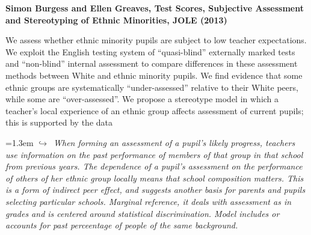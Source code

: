 \documentclass[11pt]{article}
\newcommand{\entry}[3]{%
  \par\medskip\noindent\textbf{#1}\par
  \nopagebreak #2\hspace{0.35em}{\small\color{tagcol}[#3]}\par}
\newcommand{\note}[1]{\par\smallskip\noindent\hangindent=1.3em
  \textcolor{notecol}{\footnotesize$\hookrightarrow$~\textit{#1}}}
\begin{document}
\entry{Simon Burgess and Ellen Greaves, Test Scores, Subjective Assessment and Stereotyping  of Ethnic Minorities, JOLE (2013)}{We assess whether ethnic minority pupils are subject to low teacher expectations. We exploit the English testing system of “quasi-blind” externally marked tests and “non-blind” internal assessment to compare differences in these assessment methods between White and ethnic minority pupils. We find evidence that some ethnic groups are systematically “under-assessed” relative to their White peers, while some are “over-assessed”. We propose a stereotype model in which a teacher’s local experience of an ethnic group affects assessment of current pupils; this is supported by the data}{rt}
\note{When forming an assessment of a pupil’s likely progress, teachers use information on the past performance of members of that group in that school from previous years. The dependence of a pupil’s assessment on the performance of others of her ethnic group locally means that school composition matters. This is a form of indirect peer effect, and suggests another basis for parents and pupils selecting particular schools. Marginal reference, it deals with assessment as in grades and is centered around statistical discrimination. Model includes or accounts for past perceentage of people of the same background.}
\end{document}
